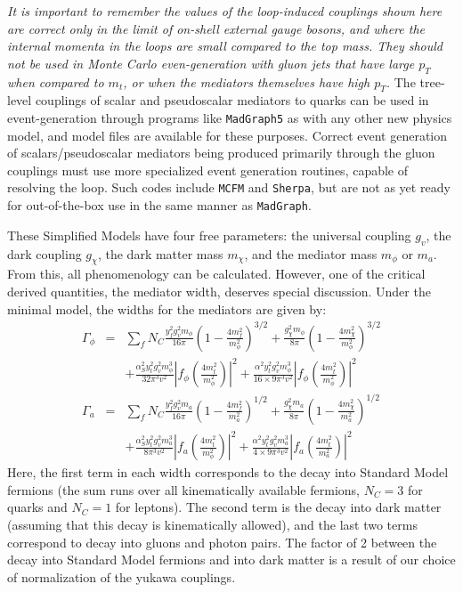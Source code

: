 {\it It is important to remember the values of the loop-induced couplings shown here are correct only in the limit of on-shell external gauge bosons, and where the internal momenta in the loops are small compared to the top mass. They should not be used in Monte Carlo even-generation with gluon jets that have large $p_T$ when compared to $m_t$, or when the mediators themselves have high $p_T$.} The tree-level couplings of scalar and pseudoscalar mediators to quarks can be used in event-generation through programs like {\tt MadGraph5} as with any other new physics model, and model files are available for these purposes. Correct event generation of scalars/pseudoscalar mediators being produced primarily through the gluon couplings must use more specialized event generation routines, capable of resolving the loop. Such codes include {\tt MCFM} and {\tt Sherpa}, but are not as yet ready for out-of-the-box use in the same manner as {\tt MadGraph}.

These Simplified Models have four free parameters: the universal coupling $g_v$, the dark coupling $g_\chi$, the dark matter mass $m_\chi$, and the mediator mass $m_{\phi}$ or $m_a$. From this, all phenomenology can be calculated. However, one of the critical derived quantities, the mediator width, deserves special discussion. Under the minimal model, the widths for the mediators are given by:
\begin{eqnarray}
\Gamma_\phi & = & \sum_f N_C \frac{y_f^2 g_v^2 m_\phi}{16 \pi} \left(1-\frac{4 m_f^2}{m_\phi^2}\right)^{3/2} + \frac{g_\chi^2 m_\phi}{8 \pi} \left(1-\frac{4 m_\chi^2}{m_\phi^2}\right)^{3/2}  \label{eq:scalarwidth} \\
& & \nonumber + \frac{\alpha_S^2 y_t^2 g_v^2 m_\phi^3}{32 \pi^3 v^2} \left| f_\phi\left(\tfrac{4m_t^2}{m_\phi^2} \right)\right|^2+ \frac{\alpha^2 y_t^2 g_v^2 m_\phi^3}{16\times 9 \pi^3 v^2} \left| f_\phi\left(\tfrac{4m_t^2}{m_\phi^2} \right)\right|^2 \label{eq:pseudoscalarwidth} \\
\Gamma_a & = & \sum_f N_C \frac{y_f^2 g_v^2 m_a}{16 \pi} \left(1-\frac{4 m_f^2}{m_a^2}\right)^{1/2} + \frac{g_\chi^2 m_a}{8 \pi} \left(1-\frac{4 m_\chi^2}{m_a^2}\right)^{1/2}  \\
& & \nonumber + \frac{\alpha_S^2 y_t^2 g_v^2 m_a^3}{8 \pi^3 v^2} \left| f_a\left(\tfrac{4m_t^2}{m_\phi^2} \right)\right|^2+ \frac{\alpha^2 y_t^2 g_v^2 m_a^3}{4\times 9 \pi^3 v^2} \left| f_a\left(\tfrac{4m_t^2}{m_a^2} \right)\right|^2 
\end{eqnarray}
Here, the first term in each width corresponds to the decay into Standard Model fermions (the sum runs over all kinematically available fermions, $N_C = 3$ for quarks and $N_C = 1$ for leptons). The second term is the decay into dark matter (assuming that this decay is kinematically allowed), and the last two terms correspond to decay into gluons and photon pairs. The factor of 2 between the decay into Standard Model fermions and into dark matter is a result of our choice of normalization of the yukawa couplings.

